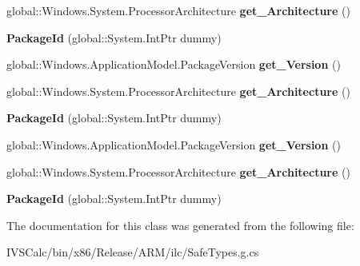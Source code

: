 \begin{DoxyCompactItemize}
\mbox{\label{class_windows_1_1_application_model_1_1_package_id_a80ce33151e556e2ca89d0e54289bd761}} 
global\+::\+Windows.\+System.\+Processor\+Architecture {\bfseries get\+\_\+\+Architecture} ()
\item 
\mbox{\label{class_windows_1_1_application_model_1_1_package_id_a5521aeec07d3e7343d3706b95bab7be0}} 
{\bfseries Package\+Id} (global\+::\+System.\+Int\+Ptr dummy)
\item 
\mbox{\label{class_windows_1_1_application_model_1_1_package_id_a1cd9711edda49a7d975a6956187bb1fc}} 
global\+::\+Windows.\+Application\+Model.\+Package\+Version {\bfseries get\+\_\+\+Version} ()
\item 
\mbox{\label{class_windows_1_1_application_model_1_1_package_id_a80ce33151e556e2ca89d0e54289bd761}} 
global\+::\+Windows.\+System.\+Processor\+Architecture {\bfseries get\+\_\+\+Architecture} ()
\item 
\mbox{\label{class_windows_1_1_application_model_1_1_package_id_a5521aeec07d3e7343d3706b95bab7be0}} 
{\bfseries Package\+Id} (global\+::\+System.\+Int\+Ptr dummy)
\item 
\mbox{\label{class_windows_1_1_application_model_1_1_package_id_a1cd9711edda49a7d975a6956187bb1fc}} 
global\+::\+Windows.\+Application\+Model.\+Package\+Version {\bfseries get\+\_\+\+Version} ()
\item 
\mbox{\label{class_windows_1_1_application_model_1_1_package_id_a80ce33151e556e2ca89d0e54289bd761}} 
global\+::\+Windows.\+System.\+Processor\+Architecture {\bfseries get\+\_\+\+Architecture} ()
\item 
\mbox{\label{class_windows_1_1_application_model_1_1_package_id_a5521aeec07d3e7343d3706b95bab7be0}} 
{\bfseries Package\+Id} (global\+::\+System.\+Int\+Ptr dummy)
\end{DoxyCompactItemize}


The documentation for this class was generated from the following file\+:\begin{DoxyCompactItemize}
\item 
I\+V\+S\+Calc/bin/x86/\+Release/\+A\+R\+M/ilc/Safe\+Types.\+g.\+cs\end{DoxyCompactItemize}
